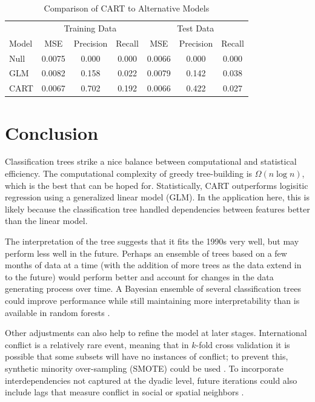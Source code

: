 \documentclass[12pt,letterpaper]{article}
\begin{document}
\begin{table}
	\caption{Comparison of CART to Alternative Models}
	\label{cart-perf}
  \begin{center}
  \begin{tabular}{l|ccc|ccc}
   \multicolumn{1}{c}{} & \multicolumn{3}{c}{Training Data} & \multicolumn{3}{c}{Test Data} \\
  Model & MSE & Precision & Recall & MSE & Precision & Recall \\
  \midrule
  Null & 0.0075 & 0.000 & 0.000 & 0.0066 & 0.000 & 0.000 \\
  GLM & 0.0082 & 0.158 & 0.022  & 0.0079 & 0.142 & 0.038 \\
  CART & 0.0067 & 0.702 & 0.192 & 0.0066 & 0.422 & 0.027 
  \end{tabular}
  \end{center}
\end{table}


\section{Conclusion}
\label{conclusion}

Classification trees strike a nice balance between computational and statistical efficiency. The computational complexity of greedy tree-building is $\Omega(n \log n)$, which is the best that can be hoped for. Statistically, CART outperforms logisitic regression using a generalized linear model (GLM). In the application here, this is likely because the classification tree handled dependencies between features better than the linear model. 

The interpretation of the tree suggests that it fits the 1990s very well, but may perform less well in the future. Perhaps an ensemble of trees based on a few months of data at a time (with the addition of more trees as the data extend in to the future) would perform better and account for changes in the data generating process over time. A Bayesian ensemble of several classification trees could improve performance while still maintaining more interpretability than is available in random forests \citep{arva2013improving,montgomery2012improving,Raftery:1995,raftery2005using}.

Other adjustments can also help to refine the model at later stages. International conflict is a relatively rare event, meaning that in $k$-fold cross validation it is possible that some subsets will have no instances of conflict; to prevent this, synthetic minority over-sampling (SMOTE) could be used \citep{chawla2002smote}. To incorporate interdependencies not captured at the dyadic level, future iterations could also include lags that measure conflict in social or spatial neighbors \citep{gleditsch2000war,gleditsch2001measuring,hoff2004modeling,ward1998democratizing,ward2007disputes,ward2011network}.
\end{document}
